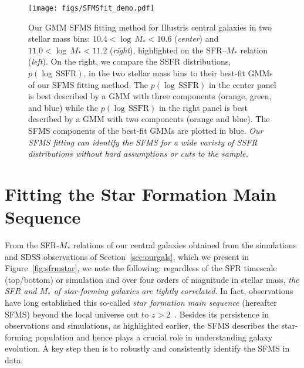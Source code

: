 \documentclass[preprint2,tighten]{aastex62}
\newcommand{\todo}[1]{{\bf \textcolor{red}{ #1}}}
\begin{document}
\begin{figure*}
\begin{center}
\texttt{[image: figs/SFMSfit\_demo.pdf]} 
\caption{
Our GMM SFMS fitting method for Illustris central galaxies in two 
stellar mass bins: $10.4 < \log\,M_* < 10.6$ (\emph{center}) and 
$11.0 < \log\,M_* < 11.2$ (\emph{right}), highlighted on the SFR--$M_*$ 
relation (\emph{left}). On the right, we compare the SSFR 
distributions, $p(\log\,\mathrm{SSFR})$, in the two stellar 
mass bins to their best-fit GMMs of our SFMS fitting method. The 
$p(\log\,\mathrm{SSFR})$ in the center panel is best described by a 
GMM with three components (orange, green, and blue) while the
$p(\log\,\mathrm{SSFR})$ in the right panel is best described by 
a GMM with two components (orange and blue). The SFMS components of the 
best-fit GMMs are plotted in blue. \emph{Our SFMS fitting can identify the 
SFMS for a wide variety of SSFR distributions without hard assumptions or 
cuts to the sample.}
}\label{fig:fitdemo}
\end{center}
\end{figure*}

\section{Fitting the Star Formation Main Sequence}\label{sec:sfmsfit}
From the SFR-$M_*$ relations of our central galaxies obtained from the simulations and 
SDSS observations of Section~\ref{sec:ourgals}, which we present in 
Figure~\ref{fig:sfrmstar}, we note the following: regardless of the SFR 
timescale (top/bottom) or simulation and over four orders of magnitude 
in stellar mass, \emph{the SFR and $M_*$ of star-forming galaxies are 
tightly correlated}. In fact, observations have long established this 
so-called \emph{star formation main sequence} (hereafter SFMS) beyond the 
local universe out to 
$z > 2$~\citep[\emph{e.g.}][\todo{more}]{noeske2007,salim2007}. 
Besides its persistence in observations and simulations, as highlighted 
earlier, the SFMS describes the star-forming population and hence plays
a crucial role in understanding galaxy evolution. A key step then is to 
robustly and consistently identify the SFMS in data. 
\end{document}
